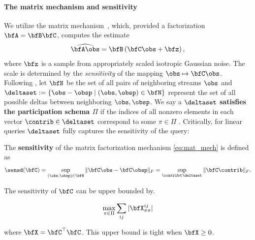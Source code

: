 \paragraph{The matrix mechanism and sensitivity}
We utilize the matrix mechanism~\citep{Li2015TheMM}, which, provided a factorization $\bfA = \bfB\bfC$, computes the estimate
\begin{equation}\label{eq:mat_mech}
\widehat{\bfA\obs} = \bfB\left(\bfC\obs + \bfz\right),
\end{equation}
where $\bfz$ is a sample from appropriately scaled isotropic Gaussian noise. The scale is determined by the \emph{sensitivity} of the mapping $\obs \mapsto \bfC \obs$. Following \citet{choquette22multiepoch}, let $\bfN$ be the set of all pairs of neighboring streams $\obs$ and $\deltaset := \left\{ \obs - \obsp \mid (\obs, \obsp) \in \bfN \right\}$ represent the set of all possible deltas between neighboring $\obs, \obsp$. We say a $\deltaset$ \textbf{satisfies the participation schema $\Pi$} if the indices of all nonzero elements in each vector $\contrib \in \deltaset$ correspond to some $\pi \in \Pi$ . Critically, for linear queries $\deltaset$ fully captures the sensitivity of the query:
\begin{definition}\label{def:sensopmech}
The \textbf{sensitivity} of the matrix factorization mechanism \cref{eq:mat_mech} is defined as
\begin{equation}\label{eq:sensopnorm}
\sensd(\bfC) = \sup_{(\obs, \obsp) \in \bfN} \| \bfC \obs - \bfC \obsp \|_F
 = \sup_{\contrib \in \deltaset} \| \bfC\contrib \|_F. 
\end{equation}
\end{definition}

\begin{prop}
The sensitivity of $\bfC$ can be upper bounded by.

$$ \max_{\pi \in \Pi} \sum_{ij} | \bfX_{\pi\pi}^{ij} | $$

where $\bfX = \bfC^{\top} \bfC$.  This upper bound is tight when $\bfX \geq 0$.
\end{prop}


